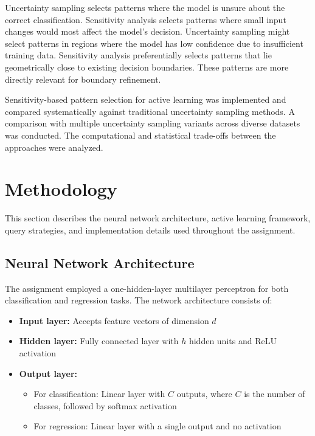 \documentclass[conference]{IEEEtran}
\begin{document}
Uncertainty sampling selects patterns where the model is unsure about the correct classification. Sensitivity analysis selects patterns where small input changes would most affect the model's decision. Uncertainty sampling might select patterns in regions where the model has low confidence due to insufficient training data. Sensitivity analysis preferentially selects patterns that lie geometrically close to existing decision boundaries. These patterns are more directly relevant for boundary refinement.

Sensitivity-based pattern selection for active learning was implemented and compared systematically against traditional uncertainty sampling methods. A comparison with multiple uncertainty sampling variants across diverse datasets was conducted. The computational and statistical trade-offs between the approaches were analyzed.

\section{Methodology}

This section describes the neural network architecture, active learning framework, query strategies, and implementation details used throughout the assignment.

\subsection{Neural Network Architecture}

The assignment employed a one-hidden-layer multilayer perceptron for both classification and regression tasks. The network architecture consists of:

\begin{itemize}
\item \textbf{Input layer:} Accepts feature vectors of dimension $d$
\item \textbf{Hidden layer:} Fully connected layer with $h$ hidden units and ReLU activation
\item \textbf{Output layer:} 
  \begin{itemize}
  \item For classification: Linear layer with $C$ outputs, where $C$ is the number of classes, followed by softmax activation
  \item For regression: Linear layer with a single output and no activation
  \end{itemize}
\end{itemize}
\end{document}
